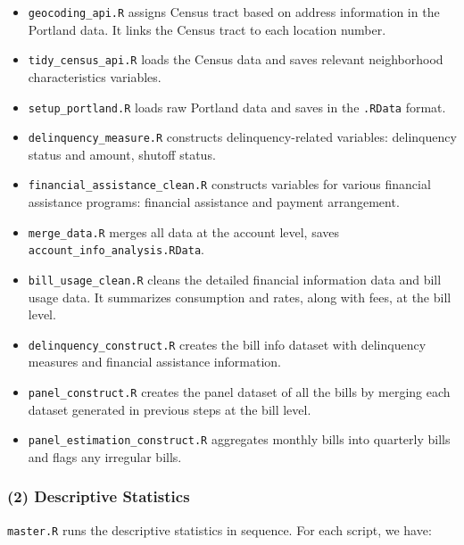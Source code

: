 \documentclass[11pt]{article}
\begin{document}
\begin{itemize}
	\item \texttt{geocoding\_api.R} assigns Census tract based on address information in the Portland data. It links the Census tract to each location number.
	\item \texttt{tidy\_census\_api.R} loads the Census data and saves relevant neighborhood characteristics variables.
	\item \texttt{setup\_portland.R} loads raw Portland data and saves in the \texttt{.RData} format.
	\item \texttt{delinquency\_measure.R} constructs delinquency-related variables: delinquency status and amount, shutoff status.
	\item \texttt{financial\_assistance\_clean.R} constructs variables for various financial assistance programs: financial assistance and payment arrangement.
	\item \texttt{merge\_data.R} merges all data at the account level, saves \texttt{account\_info\_analysis.RData}.
	\item \texttt{bill\_usage\_clean.R} cleans the detailed financial information data and bill usage data. It summarizes consumption and rates, along with fees, at the bill level.
	\item \texttt{delinquency\_construct.R} creates the bill info dataset with delinquency measures and financial assistance information.
	\item \texttt{panel\_construct.R} creates the panel dataset of all the bills by merging each dataset generated in previous steps at the bill level.
	\item \texttt{panel\_estimation\_construct.R} aggregates monthly bills into quarterly bills and flags any irregular bills.
\end{itemize}

\subsubsection*{(2) Descriptive Statistics}

\texttt{master.R} runs the descriptive statistics in sequence. For each script, we have:
\end{document}
